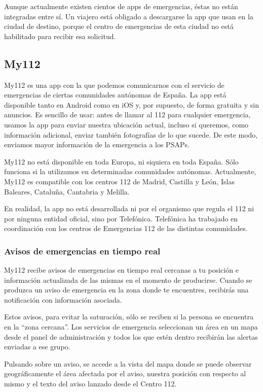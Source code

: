 Aunque actualmente existen cientos de apps de emergencias, éstas no están integradas entre sí. Un viajero está obligado a descargarse la app que usan en la ciudad de destino, porque el centro de emergencias de esta ciudad no está habilitado para recibir esa solicitud.

\subsection{My112}

My112 es una app con la que podemos comunicarnos con el servicio de emergencias de ciertas comunidades autónomas de España. La app está disponible tanto en Android como en iOS y, por supuesto, de forma gratuita y sin anuncios. Es sencillo de usar: antes de llamar al 112 para cualquier emergencia, usamos la app para enviar nuestra ubicación actual, incluso si queremos, como información adicional, enviar también fotografías de lo que sucede. De este modo, enviamos mayor información de la emergencia a los PSAPs.

My112 no está disponible en toda Europa, ni siquiera en toda España. Sólo funciona si la utilizamos en determinadas comunidades autónomas. Actualmente, My112 es compatible con los centros 112 de Madrid, Castilla y León, Islas Baleares, Cataluña, Cantabria y Melilla.

En realidad, la app no está desarrollada ni por el organismo que regula el 112 ni por ninguna entidad oficial, sino por Telefónica. Telefónica ha trabajado en coordinación con los centros de Emergencias 112 de las distintas comunidades.

\subsubsection{Avisos de emergencias en tiempo real}

My112 recibe avisos de emergencias en tiempo real cercanas a tu posición e información actualizada de las mismas en el momento de producirse. Cuando se produzca un aviso de emergencia en la zona donde te encuentres, recibirás una notificación con información asociada.

Estos avisos, para evitar la saturación, sólo se reciben si la persona se encuentra en la “zona cercana”. Los servicios de emergencia seleccionan un área en un mapa desde el panel de administración y todos los que estén dentro recibirán las alertas enviadas a ese grupo.

Pulsando sobre un aviso, se accede a la vista del mapa donde se puede observar geográficamente el área afectada por el aviso, nuestra posición con respecto al mismo y el texto del aviso lanzado desde el Centro 112.

